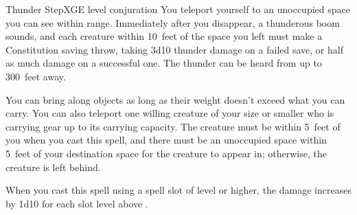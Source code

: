 \begin{spell}{Thunder Step}{XGE}{ level conjuration}
{
}
You teleport yourself to an unoccupied space you can
see within range. Immediately after you disappear, a
thunderous boom sounds, and each creature within
10~feet of the space you left must make a Constitution saving
throw, taking 3d10 thunder damage on a failed save,
or half as much damage on a successful one. The thunder
can be heard from up to 300~feet away.

You can bring along objects as long as their weight
doesn't exceed what you can carry. You can also teleport
one willing creature of your size or smaller who is
carrying gear up to its carrying capacity. The creature
must be within 5~feet of you when you cast this spell,
and there must be an unoccupied space within 5~feet of
your destination space for the creature to appear in; otherwise,
the creature is left behind.

 When you cast this spell using a
spell slot of  level or higher, the damage increases by
1d10 for each slot level above .
\end{spell}